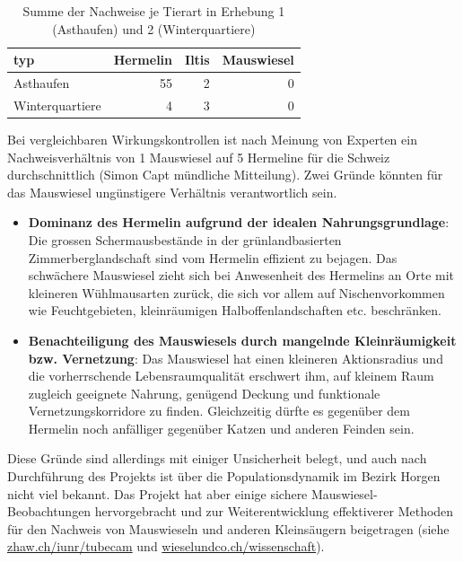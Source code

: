 \documentclass[
  oneside]{scrbook}
\providecommand{\tightlist}{%
  \setlength{\itemsep}{0pt}\setlength{\parskip}{0pt}}
\begin{document}
\begin{table}

\caption{\label{tab:unnamed-chunk-11}Summe der Nachweise je Tierart in Erhebung 1 (Asthaufen) und 2 (Winterquartiere)}
\centering
\begin{tabular}[t]{l|r|r|r}
\hline
typ & Hermelin & Iltis & Mauswiesel\\
\hline
Asthaufen & 55 & 2 & 0\\
\hline
Winterquartiere & 4 & 3 & 0\\
\hline
\end{tabular}
\end{table}

Bei vergleichbaren Wirkungskontrollen ist nach Meinung von Experten ein Nachweisverhältnis von 1 Mauswiesel auf 5 Hermeline für die Schweiz durchschnittlich (Simon Capt mündliche Mitteilung).
Zwei Gründe könnten für das Mauswiesel ungünstigere Verhältnis verantwortlich sein.

\begin{itemize}
\tightlist
\item
  \textbf{Dominanz des Hermelin aufgrund der idealen Nahrungsgrundlage}: Die grossen Schermausbestände in der grünlandbasierten Zimmerberglandschaft sind vom Hermelin effizient zu bejagen. Das schwächere Mauswiesel zieht sich bei Anwesenheit des Hermelins an Orte mit kleineren Wühlmausarten zurück, die sich vor allem auf Nischenvorkommen wie Feuchtgebieten, kleinräumigen Halboffenlandschaften etc. beschränken.
\item
  \textbf{Benachteiligung des Mauswiesels durch mangelnde Kleinräumigkeit bzw. Vernetzung}: Das Mauswiesel hat einen kleineren Aktionsradius und die vorherrschende Lebensraumqualität erschwert ihm, auf kleinem Raum zugleich geeignete Nahrung, genügend Deckung und funktionale Vernetzungskorridore zu finden. Gleichzeitig dürfte es gegenüber dem Hermelin noch anfälliger gegenüber Katzen und anderen Feinden sein.
\end{itemize}

Diese Gründe sind allerdings mit einiger Unsicherheit belegt, und auch nach Durchführung des Projekts ist über die Populationsdynamik im Bezirk Horgen nicht viel bekannt. Das Projekt hat aber einige sichere Mauswiesel-Beobachtungen hervorgebracht und zur Weiterentwicklung effektiverer Methoden für den Nachweis von Mauswieseln und anderen Kleinsäugern beigetragen (siehe \href{https://www.zhaw.ch/iunr/tubecam}{zhaw.ch/iunr/tubecam} und \href{http://wieselundco.ch/wissenschaft}{wieselundco.ch/wissenschaft}).
\end{document}
